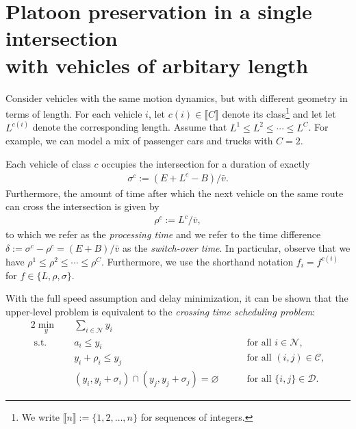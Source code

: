 \documentclass{article}
\theoremstyle{definition}
\theoremstyle{plain}
\begin{document}
\section*{Platoon preservation in a single intersection\\ with vehicles of arbitary length}

Consider vehicles with the same motion dynamics, but with different geometry in
terms of length.
%
For each vehicle $i$, let $c(i) \in \llbracket C \rrbracket$ denote its class\footnote{We write $\llbracket n \rrbracket := \{1, 2, \dots, n\}$ for sequences of integers.}
and let let $L^{c(i)}$ denote the corresponding length. Assume that
$L^1 \leq L^2 \leq \cdots \leq L^C$.
%
For example, we can model a mix of passenger cars and trucks with $C = 2$.

Each vehicle of class $c$ occupies the intersection for a duration of exactly
\begin{align*}
  \sigma^c := (E + L^c - B) / \bar{v} .
\end{align*}
Furthermore, the amount of time after which the next vehicle on the same route
can cross the intersection is given by
\begin{align*}
  \rho^c := L^c / \bar{v} ,
\end{align*}
to which we refer as the \emph{processing time} and we refer to the time
difference $\delta := \sigma^c - \rho^c = (E + B) / \bar{v}$ as the
\emph{switch-over time}.
%
In particular, observe that we have $\rho^1 \leq \rho^2 \leq \cdots \leq \rho^C$.
%
Furthermore, we use the shorthand notation $f_i = f^{c(i)}$ for $f \in \{L, \rho, \sigma\}$.

With the full speed assumption and delay minimization, it can be shown that the
upper-level problem is equivalent to the \emph{crossing time scheduling
  problem}:
%
\begin{alignat}{2}\label{eq:C}
  \min_{y} \quad & \sum_{i \in \mathcal{N}} y_i \tag{C} \\
  \text{ s.t.} \quad & a_{i} \leq y_i  && \quad \text{ for all } i \in \mathcal{N} , \label{eq:arrival} \tag{C.1} \\
                    & y_i + \rho_i \leq y_{j}  && \quad \text{ for all } (i,j) \in \mathcal{C} , \label{eq:conjunctive} \tag{C.2} \\
                    & (y_{i}, y_i + \sigma_i) \cap (y_{j}, y_j + \sigma_j) = \varnothing && \quad \text{ for all } \{i,j\} \in \mathcal{D} . \label{eq:disjunctive} \tag{C.3}
\end{alignat}
\end{document}

